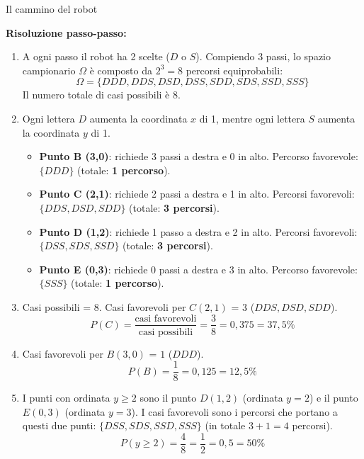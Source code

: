 \begin{esercizio}{Il cammino del robot}
\begin{soluzione}
  \textbf{Risoluzione passo-passo:}
  \begin{enumerate}[label=\alph*)]
    \item A ogni passo il robot ha 2 scelte ($D$ o $S$). Compiendo 3 passi, lo spazio campionario $\Omega$ è composto da $2^3 = 8$ percorsi equiprobabili:
    \[
    \Omega = \{DDD, DDS, DSD, DSS, SDD, SDS, SSD, SSS\}
    \]
    Il numero totale di casi possibili è $8$.
    \item Ogni lettera $D$ aumenta la coordinata $x$ di 1, mentre ogni lettera $S$ aumenta la coordinata $y$ di 1.
    \begin{itemize}
      \item \textbf{Punto B (3,0)}: richiede 3 passi a destra e 0 in alto. Percorso favorevole: $\{DDD\}$ (totale: \textbf{1 percorso}).
      \item \textbf{Punto C (2,1)}: richiede 2 passi a destra e 1 in alto. Percorsi favorevoli: $\{DDS, DSD, SDD\}$ (totale: \textbf{3 percorsi}).
      \item \textbf{Punto D (1,2)}: richiede 1 passo a destra e 2 in alto. Percorsi favorevoli: $\{DSS, SDS, SSD\}$ (totale: \textbf{3 percorsi}).
      \item \textbf{Punto E (0,3)}: richiede 0 passi a destra e 3 in alto. Percorso favorevole: $\{SSS\}$ (totale: \textbf{1 percorso}).
    \end{itemize}
    \item Casi possibili = $8$. Casi favorevoli per $C(2,1)$ = $3$ ($DDS, DSD, SDD$).
    \[
    P(C) = \frac{\text{casi favorevoli}}{\text{casi possibili}} = \frac{3}{8} = 0{,}375 = 37{,}5\%
    \]
    \item Casi favorevoli per $B(3,0)$ = $1$ ($DDD$).
    \[
    P(B) = \frac{1}{8} = 0{,}125 = 12{,}5\%
    \]
    \item I punti con ordinata $y \ge 2$ sono il punto $D(1,2)$ (ordinata $y=2$) e il punto $E(0,3)$ (ordinata $y=3$).
    I casi favorevoli sono i percorsi che portano a questi due punti: $\{DSS, SDS, SSD, SSS\}$ (in totale $3 + 1 = 4$ percorsi).
    \[
    P(y \ge 2) = \frac{4}{8} = \frac{1}{2} = 0{,}5 = 50\%
    \]
  \end{enumerate}
\end{soluzione}
\end{esercizio}

\condnewpage

